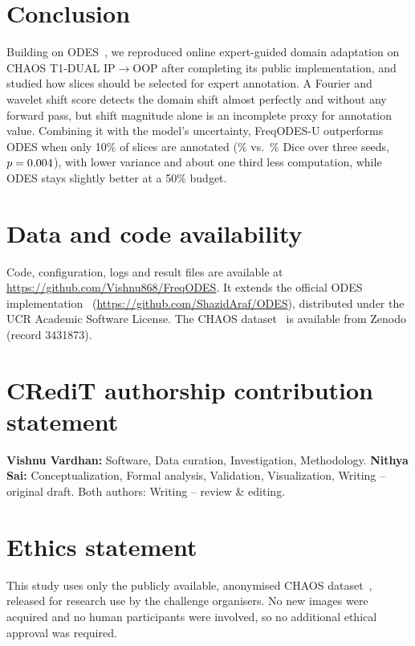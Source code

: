 \documentclass[a4paper,fleqn]{cas-dc}
\begin{document}
\section{Conclusion}
Building on ODES~\cite{islam2025odes}, we reproduced online expert-guided domain adaptation on CHAOS T1-DUAL IP$\rightarrow$OOP after completing its public implementation, and studied how slices should be selected for expert annotation. A Fourier and wavelet shift score detects the domain shift almost perfectly and without any forward pass, but shift magnitude alone is an incomplete proxy for annotation value. Combining it with the model's uncertainty, FreqODES-U outperforms ODES when only 10\% of slices are annotated (\VFeTenMean\% vs.\ \VBnTenMean\% Dice over three seeds, $p=0.004$), with lower variance and about one third less computation, while ODES stays slightly better at a 50\% budget.

\section*{Data and code availability}
Code, configuration, logs and result files are available at \url{https://github.com/Vishnu868/FreqODES}. It extends the official ODES implementation~\cite{islam2025odes} (\url{https://github.com/ShazidAraf/ODES}), distributed under the UCR Academic Software License. The CHAOS dataset~\cite{kavur2021chaos} is available from Zenodo (record 3431873).

\section*{CRediT authorship contribution statement}
\textbf{Vishnu Vardhan:} Software, Data curation, Investigation, Methodology. \textbf{Nithya Sai:} Conceptualization, Formal analysis, Validation, Visualization, Writing -- original draft. Both authors: Writing -- review \& editing.

\section*{Ethics statement}
This study uses only the publicly available, anonymised CHAOS dataset~\cite{kavur2021chaos}, released for research use by the challenge organisers. No new images were acquired and no human participants were involved, so no additional ethical approval was required.
\end{document}
